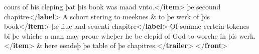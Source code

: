 \begin{shaded}
\hspace*{1em}\hspace*{1em}\hspace*{1em}\hspace*{1em}\hspace*{1em}\hspace*{1em} cours of his cleping þat þis book was maad vnto.{</\textbf{item}>}\mbox{}\newline 
\hspace*{1em}\hspace*{1em}þe secound chapitre{</\textbf{label}>}\mbox{}\newline 
\hspace*{1em}\hspace*{1em}A schort stering to meeknes \& to þe werk of þis\mbox{}\newline 
\hspace*{1em}\hspace*{1em}\hspace*{1em}\hspace*{1em}\hspace*{1em}\hspace*{1em} book{</\textbf{item}>}\mbox{}\newline 
\hspace*{1em}\hspace*{1em}þe fiue and seuenti chapitre{</\textbf{label}>}\mbox{}\newline 
\hspace*{1em}\hspace*{1em}Of somme certein tokenes bi þe whiche a man may proue\mbox{}\newline 
\hspace*{1em}\hspace*{1em}\hspace*{1em}\hspace*{1em}\hspace*{1em}\hspace*{1em} wheþer he be clepid of God to worche in þis werk.{</\textbf{item}>}\mbox{}\newline 
\hspace*{1em}\mbox{}\newline 
\hspace*{1em}\& here eendeþ þe table of þe chapitres.{</\textbf{trailer}>}\mbox{}\newline 
{}\mbox{}\newline 
{</\textbf{front}>}\end{shaded}\egroup\par \noindent  \par
